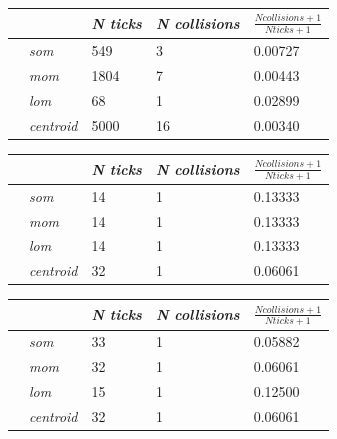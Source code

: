 \documentclass[conference]{IEEEtran}
\begin{document}
\begin{center}
\begin{tabular}{ | m{2.8em} | m{3em} | m{2.8em} | m{5em} | m{5.2em} | }
\hline
{} & \textit{N ticks} & \textit{N collisions} & $\frac{N collisions + 1}{N ticks + 1}$ \\
\hline
{} & \textit{som} & 549 & 3 & 0.00727 \\
 & \textit{mom} & 1804 & 7 & 0.00443 \\
 & \textit{lom} & 68 & 1 & 0.02899 \\
 & \textit{centroid} & 5000 & 16 & 0.00340 \\
\hline
\end{tabular}
\label{table:ps5e2asum}
\end{center}





\begin{center}
\begin{tabular}{ | m{2.8em} | m{3em} | m{2.8em} | m{5em} | m{5.2em} | }
\hline
{} & \textit{N ticks} & \textit{N collisions} & $\frac{N collisions + 1}{N ticks + 1}$ \\
\hline
{} & \textit{som} & 14 & 1 & 0.13333 \\
 & \textit{mom} & 14 & 1 & 0.13333 \\
 & \textit{lom} & 14 & 1 & 0.13333 \\
 & \textit{centroid} & 32 & 1 & 0.06061 \\
\hline
\end{tabular}
\label{table:ps10e1amax}
\end{center}

\begin{center}
\begin{tabular}{ | m{2.8em} | m{3em} | m{2.8em} | m{5em} | m{5.2em} | }
\hline
{} & \textit{N ticks} & \textit{N collisions} & $\frac{N collisions + 1}{N ticks + 1}$ \\
\hline
{} & \textit{som} & 33 & 1 & 0.05882 \\
 & \textit{mom} & 32 & 1 & 0.06061 \\
 & \textit{lom} & 15 & 1 & 0.12500 \\
 & \textit{centroid} & 32 & 1 & 0.06061 \\
\hline
\end{tabular}
\label{table:ps10e1asum}
\end{center}
\end{document}
